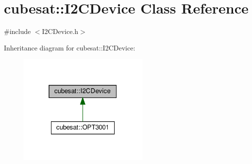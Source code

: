 \hypertarget{classcubesat_1_1I2CDevice}{}\section{cubesat\+:\+:I2\+C\+Device Class Reference}
\label{classcubesat_1_1I2CDevice}


{\ttfamily \#include $<$I2\+C\+Device.\+h$>$}



Inheritance diagram for cubesat\+:\+:I2\+C\+Device\+:\nopagebreak
\begin{figure}[H]
\begin{center}
\leavevmode
\includegraphics[width=184pt]{classcubesat_1_1I2CDevice__inherit__graph}
\end{center}
\end{figure}
